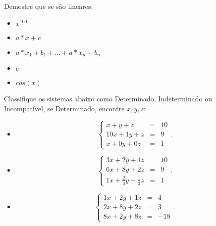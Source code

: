 \begin{exer}
        Demostre que se são lineares:
        \begin{itemize}
            \item $x^{100}$
            \item $a*x+c$
            \item $a*x_1 + b_1 +\ldots+ a*x_n + b_n$
            \item $e$
            \item $cos(x)$
        \end{itemize}
\end{exer}
\begin{exer}
         Classifique os sistemas abaixo como Determinado, Indeterminado ou Incompatível,
        se Determinado, encontre $x,y,z$:
        \begin{itemize}
            \item \begin{equation}
                        \left\{
                            \begin{array}{rcl}
                                x+y+z&=&10 \\
                                10x+1y+z&=&9 \\
                                x+0y+0z&=&1
                            \end{array}
                        \right..
                   \end{equation}
            \item \begin{equation}
                        \left\{
                        \begin{array}{ccccc|c}
                            3x+2y+1z&=&10 \\
                            6x+8y+2z&=&9 \\
                            1x+\frac{2}{3}y+\frac{1}{3}z&=&1
                        \end{array}
                        \right..
                   \end{equation}
            \item  \begin{equation}
                        \left\{
                            \begin{array}{ccccc|c}
                                1x+2y+1z&=&4 \\
                                2x+8y+2z&=&3 \\
                                8x+2y+8z&=&-18
                            \end{array}
                        \right..
                    \end{equation}
        \end{itemize}
\end{exer}

